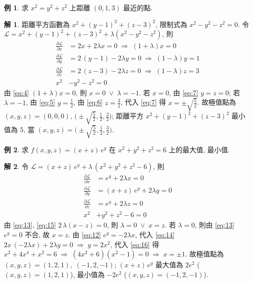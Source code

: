 \documentclass[12pt]{extarticle}
\newcommand{\ds}{\displaystyle}
\newcommand{\ie}{\;\Longrightarrow\;}
\newcommand{\orr}{\;\vee\;}
\theoremstyle{definition}
\newtheorem*{ex}{例}
\newtheorem*{sol}{解}
\newcommand{\pdiff}[2]{\frac{\partial #1}{\partial #2}}
\begin{document}
\begin{ex}
  求 $x^2 = y^2 + z^2$ 上距離 $(0, 1, 3)$ 最近的點. 
\end{ex}

\begin{sol}
  距離平方函數為 $x^2 + (y - 1)^2 + (z - 3)^2$, 限制式為 $x^2 - y^2 - z^2 = 0$. 令 $\ds\mathcal{L} = x^2 + (y - 1)^2 + (z - 3)^2 + \lambda(x^2 - y^2 - z^2)$, 則
  \begin{align}
    \pdiff{\mathcal{L}}{x} &= 2 x + 2\lambda x = 0\ie (1 + \lambda) x = 0 \label{eq:4}\\
    \pdiff{\mathcal{L}}{y} &= 2\,(y - 1) - 2\lambda y = 0\ie (1 - \lambda) y = 1 \label{eq:5} \\
    \pdiff{\mathcal{L}}{z} &= 2\,(z - 3) - 2\lambda z = 0\ie (1 - \lambda) z = 3 \label{eq:6} \\
    x^2 &- y^2 - z^2 = 0 \label{eq:7}
  \end{align}
  由 \eqref{eq:4} $(1 + \lambda) x = 0$, 則 $x = 0\orr\lambda = -1$. 若 $x = 0$, 由 \eqref{eq:7} $y = z = 0$; 若 $\lambda = -1$, 由 \eqref{eq:5} $y = \frac{1}{2}$, 由 \eqref{eq:6} $z = \frac{3}{2}$, 代入 \eqref{eq:7} 得 $x = \pm\sqrt{\frac{5}{2}}$. 故極值點為 $(x, y, z) = (0, 0, 0),\,\Big(\pm\sqrt{\frac{5}{2}}, \frac{1}{2}, \frac{3}{2}\Big)$; 距離平方 $x^2 + (y - 1)^2 + (z - 3)^2$ 最小值為 $5$, 當 $(x, y, z) = \Big(\pm\sqrt{\frac{5}{2}}, \frac{1}{2}, \frac{3}{2}\Big)$. 
\end{sol}

\begin{ex}
  求 $\ds f(x, y, z) = (x + z)\,e^y$ 在 $x^2 + y^2 + z^2 = 6$ 上的最大值, 最小值. 
\end{ex}
  
\begin{sol}
  令 $\ds\mathcal{L} = (x + z)\,e^y + \lambda\,(x^2 + y^2 + z^2 - 6)$, 則 
  \begin{align}
    \pdiff{\mathcal{L}}{x} &= e^y + 2\lambda x = 0\label{eq:13}\\
    \pdiff{\mathcal{L}}{y} &= (x + z)\,e^y + 2\lambda y = 0\label{eq:14} \\
    \pdiff{\mathcal{L}}{z} &= e^y + 2\lambda z = 0\label{eq:15} \\
    x^2 &+ y^2 + z^2 - 6 = 0 \label{eq:16}
  \end{align}
  由 \eqref{eq:13}, \eqref{eq:15} $2\,\lambda(x - z) = 0$, 則 $\lambda = 0\orr x = z$. 若 $\lambda = 0$, 則由 \eqref{eq:13} $\ds e^y = 0$ 不合, 故 $x = z$. 由 \eqref{eq:12} $e^y = -2\lambda x$, 代入 \eqref{eq:14} $2x\,(-2\lambda x) + 2\lambda y = 0\ie y = 2x^2$, 代入 \eqref{eq:16} 得 $x^2 + 4x^4 + x^2 = 6\ie (4x^2 + 6)(x^2 - 1) = 0 \ie x = \pm 1$. 故極值點為 $(x, y, z) = (1, 2, 1),\;(-1, 2, -1)$; $(x + z)\,e^y$ 最大值為 $2e^2$ ($(x, y, z) = (1, 2, 1)$), 最小值為 $-2e^2$ ($(x, y, z) = (-1, 2, -1)$). 
\end{sol}
\end{document}

